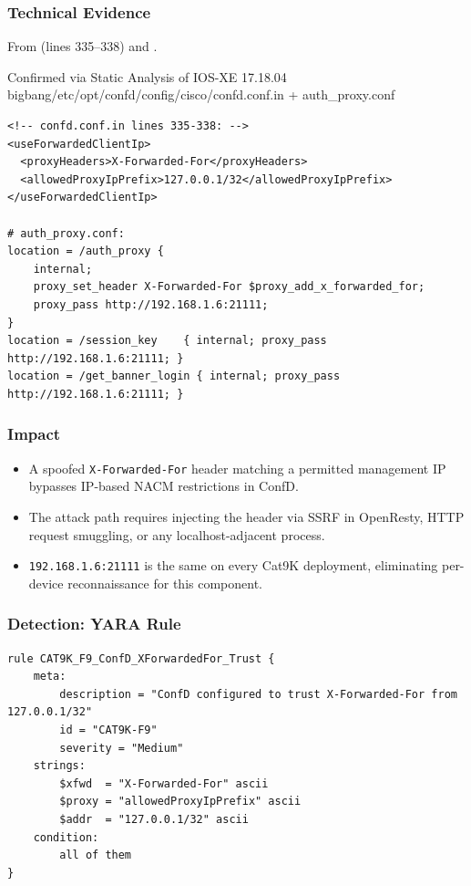 \documentclass[11pt,a4paper]{article}
\begin{document}
\subsubsection{Technical Evidence}

From  (lines 335--338) and
.

\begin{pocbox}{Confirmed via Static Analysis of IOS-XE 17.18.04 bigbang/etc/opt/confd/config/cisco/confd.conf.in + auth\_proxy.conf}
\begin{lstlisting}
<!-- confd.conf.in lines 335-338: -->
<useForwardedClientIp>
  <proxyHeaders>X-Forwarded-For</proxyHeaders>
  <allowedProxyIpPrefix>127.0.0.1/32</allowedProxyIpPrefix>
</useForwardedClientIp>

# auth_proxy.conf:
location = /auth_proxy {
    internal;
    proxy_set_header X-Forwarded-For $proxy_add_x_forwarded_for;
    proxy_pass http://192.168.1.6:21111;
}
location = /session_key    { internal; proxy_pass http://192.168.1.6:21111; }
location = /get_banner_login { internal; proxy_pass http://192.168.1.6:21111; }
\end{lstlisting}
\end{pocbox}

\subsubsection{Impact}

\begin{itemize}[nosep]
  \item A spoofed \texttt{X-Forwarded-For} header matching a permitted management IP
    bypasses IP-based NACM restrictions in ConfD.
  \item The attack path requires injecting the header via SSRF in OpenResty, HTTP
    request smuggling, or any localhost-adjacent process.
  \item \texttt{192.168.1.6:21111} is the same on every Cat9K deployment, eliminating
    per-device reconnaissance for this component.
\end{itemize}

\subsubsection{Detection: YARA Rule}

\begin{lstlisting}[style=yara]
rule CAT9K_F9_ConfD_XForwardedFor_Trust {
    meta:
        description = "ConfD configured to trust X-Forwarded-For from 127.0.0.1/32"
        id = "CAT9K-F9"
        severity = "Medium"
    strings:
        $xfwd  = "X-Forwarded-For" ascii
        $proxy = "allowedProxyIpPrefix" ascii
        $addr  = "127.0.0.1/32" ascii
    condition:
        all of them
}
\end{lstlisting}
\end{document}
